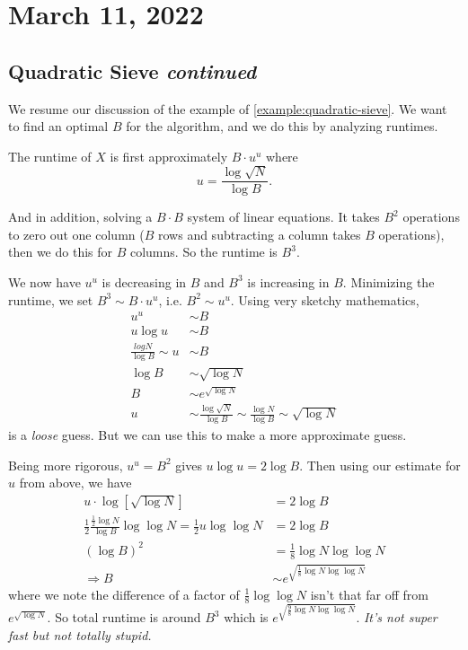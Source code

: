 \section{March 11, 2022}
\subsection{Quadratic Sieve \emph{continued}}
We resume our discussion of the example of \cref{example:quadratic-sieve}. We want to find an optimal $B$ for the algorithm, and we do this by analyzing runtimes.

The runtime of $X$ is first approximately $B\cdot u^u$ where \[u = \frac{\log \sqrt{N}}{\log B}.\]

And in addition, solving a $B\cdot B$ system of linear equations. It takes $B^2$ operations to zero out one column ($B$ rows and subtracting a column takes $B$ operations), then we do this for $B$ columns. So the runtime is $B^3$.

We now have $u^u$ is decreasing in $B$ and $B^3$ is increasing in $B$. Minimizing the runtime, we set $B^3 \sim B\cdot u^u$, i.e. $B^2\sim u^u$. Using very sketchy mathematics,
\begin{align*}
    u^u                        & \sim B                             \\
    u\log u                    & \sim B                             \\
    \frac{log N}{\log B}\sim u & \sim B                             \\
    \log B                     & \sim \sqrt{\log N}                 \\
    B                          & \sim e^{\sqrt{\log N}}             \\
    u                          & \sim \frac{\log{\sqrt{N}}}{\log B}
    \sim \frac{\log N}{\log B} \sim \sqrt{\log N}
\end{align*}
is a \emph{loose} guess. But we can use this to make a more approximate guess.

Being more rigorous, $u^u= B^2$ gives $u\log u = 2\log B$. Then using our estimate for $u$ from above, we have
\begin{align*}
    u\cdot \log\left[\sqrt{\log N}\right] & = 2\log B                                    \\
    \frac{1}{2}\frac{\frac{1}{2}\log N}{\log B}\log\log N
    = \frac{1}{2}u\log\log N              & = 2\log B                                    \\
    (\log B)^2                            & = \frac{1}{8}\log N\log\log N                \\
    \Rightarrow B                         & \sim e^{\sqrt{\frac{1}{8}\log N \log\log N}}
\end{align*}
where we note the difference of a factor of $\frac{1}{8}\log\log N$ isn't that far off from $e^{\sqrt{\log N}}$. So total runtime is around $B^3$ which is $e^{\sqrt{\frac{9}{8}\log N\log\log N}}$. \emph{It's not super fast but not totally stupid.}

